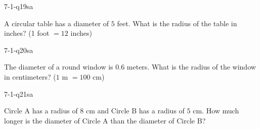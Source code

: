 \begin{practiceQuestion}{7-1-q19}{sa}
\begin{questionText}
A circular table has a diameter of $5$ feet. What is the radius of the table in inches? (1 foot $= 12$ inches)
\end{questionText}
\end{practiceQuestion}

\begin{practiceQuestion}{7-1-q20}{sa}
\begin{questionText}
The diameter of a round window is $0.6$ meters. What is the radius of the window in centimeters? ($1$ m $= 100$ cm)
\end{questionText}
\end{practiceQuestion}

\begin{practiceQuestion}{7-1-q21}{sa}
\begin{questionText}
Circle A has a radius of $8$ cm and Circle B has a radius of $5$ cm. How much longer is the diameter of Circle A than the diameter of Circle B?
\end{questionText}
\end{practiceQuestion}


